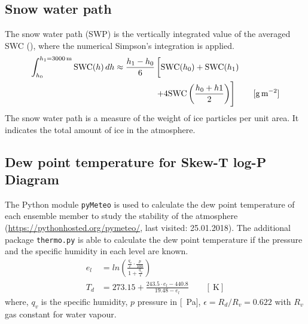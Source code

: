 \subsection{Snow water path}
The snow water path (SWP) is the vertically integrated value of the averaged SWC (), where the numerical Simpson's integration is applied.  
\begin{equation}
\begin{split}
\int_{h_0}^{h_1=\SI{3000}{\metre}} \text{SWC}(h) \, dh \approx 
\frac{h_1 - h_0}{6}  & \left[ \text{SWC}(h_0)    + \text{SWC}(h_1)   \vphantom{\frac{h_0 + h1}{2}} \right. \\ 
& \left. + 4 \text{SWC}\left(\frac{h_0 + h1}{2}\right)  
\right] \qquad [\SI{}{\g\per\square\meter}]
\end{split}
\label{eq:SWP}
\end{equation}
The snow water path is a measure of the weight of ice particles per unit area. It indicates the total amount of ice in the atmosphere.



\subsection{Dew point temperature for Skew-T log-P Diagram}
The Python module \texttt{pyMeteo} is used to calculate the dew point temperature of each ensemble member to study the stability of the atmosphere (\url{https://pythonhosted.org/pymeteo/}, last visited: 25.01.2018). The additional package \texttt{thermo.py} is able to calculate the dew point temperature if the pressure and the specific humidity in each level are known. 
\begin{align}
e_l & = ln\left( \frac{\frac{q_v}{\epsilon} \cdot \frac{p}{100}}{1 + \frac{q_v}{\epsilon}} \right) \\
T_d & = 273.15 + \frac{243.5 \cdot e_l -440.8}{19.48 -e_l} \qquad [\SI{}{\kelvin}]
\end{align}
where, $q_v$ is the specific humidity, $p$ pressure in [\SI{}{\Pa}], $\epsilon = R_d / R_v = 0.622$ with $R_v$ gas constant for water vapour.